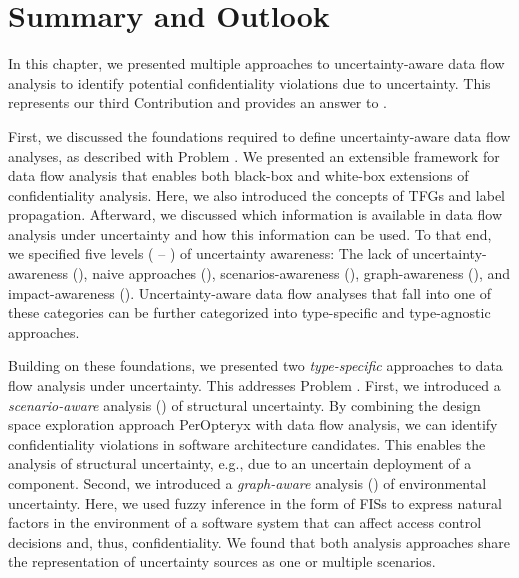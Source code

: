 \section{Summary and Outlook}%
\label{sec:confidentialityanalysis:summary}

In this chapter, we presented multiple approaches to uncertainty-aware data flow analysis to identify potential confidentiality violations due to uncertainty.
This represents our third Contribution  and provides an answer to .

First, we discussed the foundations required to define uncertainty-aware data flow analyses, as described with Problem .
We presented an extensible framework for data flow analysis \cite{boltz_extensible_2024} that enables both black-box and white-box extensions \cite{taghavi_survey_2023,heinrich_composing_2021} of confidentiality analysis.
Here, we also introduced the concepts of \acp{TFG} and label propagation.
Afterward, we discussed which information is available in data flow analysis under uncertainty and how this information can be used.
To that end, we specified five levels ( -- ) of uncertainty awareness: The lack of uncertainty-awareness (), naive approaches (), scenarios-awareness (), graph-awareness (), and impact-awareness ().
Uncertainty-aware data flow analyses that fall into one of these categories can be further categorized into type-specific and type-agnostic approaches.

Building on these foundations, we presented two \emph{type-specific} approaches to data flow analysis under uncertainty.
This addresses Problem .
First, we introduced a \emph{scenario-aware} analysis () of structural uncertainty.
By combining the design space exploration approach PerOpteryx \cite{koziolek_peropteryx_2011,koziolek_automated_2011} with data flow analysis, we can identify confidentiality violations in software architecture candidates.
This enables the analysis of structural uncertainty, e.g., due to an uncertain deployment of a component.
Second, we introduced a \emph{graph-aware} analysis () of environmental uncertainty.
Here, we used fuzzy inference in the form of \acp{FIS} to express natural factors in the environment of a software system that can affect access control decisions and, thus, confidentiality.
We found that both analysis approaches share the representation of uncertainty sources as one or multiple scenarios.

